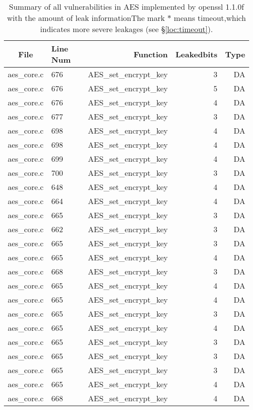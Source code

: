 \begin{table*}%
\centering
\caption{Summary of all vulnerabilities in AES implemented by openssl 1.1.0f with the amount of leak informationThe mark $*$ means timeout,which indicates more severe leakages (see \S\ref{loc:timeout}).}\label{tab:AESopenssl}
\begin{tabular}{clrrr}
\hline
\textbf{File} & \textbf{Line Num} & \textbf{Function} & \textbf{Leakedbits} & \textbf{Type} \\\hline
aes\_core.c&676&AES\_set\_encrypt\_key&3 &DA\\
aes\_core.c&676&AES\_set\_encrypt\_key&5 &DA\\
aes\_core.c&676&AES\_set\_encrypt\_key&4 &DA\\
aes\_core.c&677&AES\_set\_encrypt\_key&3 &DA\\
aes\_core.c&698&AES\_set\_encrypt\_key&4 &DA\\
aes\_core.c&698&AES\_set\_encrypt\_key&4 &DA\\
aes\_core.c&699&AES\_set\_encrypt\_key&4 &DA\\
aes\_core.c&700&AES\_set\_encrypt\_key&3 &DA\\
aes\_core.c&648&AES\_set\_encrypt\_key&4 &DA\\
aes\_core.c&664&AES\_set\_encrypt\_key&4 &DA\\
aes\_core.c&665&AES\_set\_encrypt\_key&3 &DA\\
aes\_core.c&662&AES\_set\_encrypt\_key&3 &DA\\
aes\_core.c&665&AES\_set\_encrypt\_key&3 &DA\\
aes\_core.c&665&AES\_set\_encrypt\_key&4 &DA\\
aes\_core.c&668&AES\_set\_encrypt\_key&3 &DA\\
aes\_core.c&665&AES\_set\_encrypt\_key&4 &DA\\
aes\_core.c&665&AES\_set\_encrypt\_key&4 &DA\\
aes\_core.c&665&AES\_set\_encrypt\_key&3 &DA\\
aes\_core.c&665&AES\_set\_encrypt\_key&4 &DA\\
aes\_core.c&665&AES\_set\_encrypt\_key&3 &DA\\
aes\_core.c&665&AES\_set\_encrypt\_key&3 &DA\\
aes\_core.c&665&AES\_set\_encrypt\_key&3 &DA\\
aes\_core.c&665&AES\_set\_encrypt\_key&4 &DA\\
aes\_core.c&668&AES\_set\_encrypt\_key&4 &DA\\

\end{tabular}
\end{table*}
